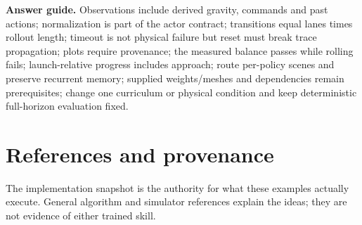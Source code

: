 \documentclass[
  american,
  11pt,
  letterpaper,
]{article}
\begin{document}
\textbf{Answer guide.} Observations include derived gravity, commands
and past actions; normalization is part of the actor contract;
transitions equal lanes times rollout length; timeout is not physical
failure but reset must break trace propagation; plots require
provenance; the measured balance passes while rolling fails;
launch-relative progress includes approach; route per-policy scenes and
preserve recurrent memory; supplied weights/meshes and dependencies
remain prerequisites; change one curriculum or physical condition and
keep deterministic full-horizon evaluation fixed.

\section{References and provenance}\label{references-and-provenance}

The implementation snapshot is the authority for what these examples
actually execute. General algorithm and simulator references explain the
ideas; they are not evidence of either trained skill.
\end{document}
